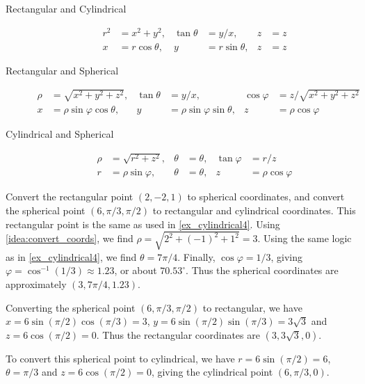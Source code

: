 \begin{keyidea}\label{idea:convert_coords}
\begin{description}
\item[Rectangular and Cylindrical]
\begin{align*}
r^2 &= x^2+y^2, & \tan \theta &= y/x, & z&=z\\
x&=r\cos \theta, & y&=r\sin\theta, & z&=z
\end{align*}

\item[Rectangular and Spherical]
\begin{align*}
\rho &= \sqrt{x^2+y^2+z^2}, & \tan \theta &= y/x, & \cos \varphi &= z/\sqrt{x^2+y^2+z^2}\\
x&=\rho\sin\varphi\cos\theta, & y&=\rho\sin\varphi\sin\theta, & z&=\rho\cos\varphi
\end{align*}

\item[Cylindrical and Spherical]
\begin{align*}
\rho&=\sqrt{r^2+z^2}, & \theta &= \theta,& \tan \varphi &= r/z \\
r&=\rho \sin \varphi, & \theta &= \theta, & z&=\rho\cos\varphi
\end{align*}
\end{description}
\end{keyidea}


\begin{example}\label{ex_spherical4}
Convert the rectangular point $(2,-2,1)$ to spherical coordinates, and convert the spherical point $(6,\pi/3,\pi/2)$ to rectangular and cylindrical coordinates.
\solution
This rectangular point is the same as used in \autoref{ex_cylindrical4}. Using \autoref{idea:convert_coords}, we find $\rho = \sqrt{2^2+(-1)^2+1^2} = 3$. Using the same logic as in \autoref{ex_cylindrical4}, we find $\theta = 7\pi/4$. Finally, $\cos\varphi = 1/3$, giving $\varphi = \cos^{-1}(1/3) \approx 1.23$, or about $70.53^\circ$. Thus the spherical coordinates are approximately $(3,7\pi/4,1.23)$.

Converting the spherical point $(6,\pi/3,\pi/2)$ to rectangular, we have $x = 6\sin(\pi/2)\cos(\pi/3) = 3$, $y = 6\sin(\pi/2)\sin(\pi/3) = 3\sqrt{3}$ and $z = 6\cos(\pi/2) = 0$. Thus the rectangular coordinates are $(3,3\sqrt{3},0)$.

To convert this spherical point to cylindrical, we have $r = 6\sin(\pi/2) = 6$, $\theta = \pi/3$ and $z = 6\cos(\pi/2) =0$, giving the cylindrical point $(6,\pi/3,0)$.
\end{example}

